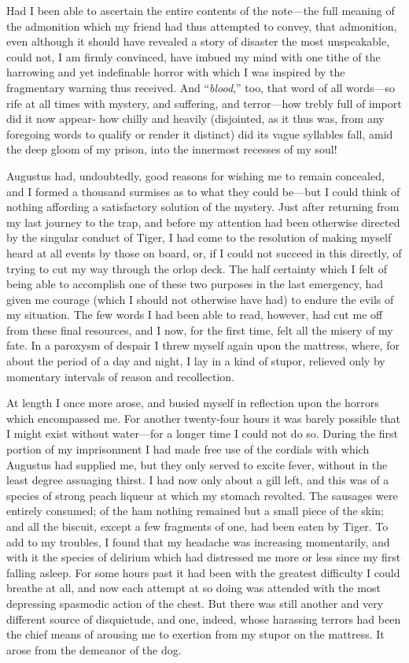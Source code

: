Had I been able to ascertain the entire contents of the note---the full
meaning of the admonition which my friend had thus attempted to convey, that
admonition, even although it should have revealed a story of disaster the most
unspeakable, could not, I am firmly convinced, have imbued my mind with one
tithe of the harrowing and yet indefinable horror with which I was inspired by
the fragmentary warning thus received. And ``\emph{blood},'' too, that word of all
words---so rife at all times with mystery, and suffering, and terror---how
trebly full of import did it now appear- how chilly and heavily (disjointed, as
it thus was, from any foregoing words to qualify or render it distinct) did its
vague syllables fall, amid the deep gloom of my prison, into the innermost
recesses of my soul! 

Augustus had, undoubtedly, good reasons for wishing me to remain concealed,
and I formed a thousand surmises as to what they could be---but I could think of
nothing affording a satisfactory solution of the mystery. Just after returning
from my last journey to the trap, and before my attention had been otherwise
directed by the singular conduct of Tiger, I had come to the resolution of
making myself heard at all events by those on board, or, if I could not succeed
in this directly, of trying to cut my way through the orlop deck. The half
certainty which I felt of being able to accomplish one of these two purposes in
the last emergency, had given me courage (which I should not otherwise have had)
to endure the evils of my situation. The few words I had been able to read,
however, had cut me off from these final resources, and I now, for the first
time, felt all the misery of my fate. In a paroxysm of despair I threw myself
again upon the mattress, where, for about the period of a day and night, I lay
in a kind of stupor, relieved only by momentary intervals of reason and
recollection. 

At length I once more arose, and busied myself in reflection upon the horrors
which encompassed me. For another twenty-four hours it was barely possible that
I might exist without water---for a longer time I could not do so. During the
first portion of my imprisonment I had made free use of the cordials with which
Augustus had supplied me, but they only served to excite fever, without in the
least degree assuaging thirst. I had now only about a gill left, and this was of
a species of strong peach liqueur at which my stomach revolted. The sausages
were entirely consumed; of the ham nothing remained but a small piece of the
skin; and all the biscuit, except a few fragments of one, had been eaten by
Tiger. To add to my troubles, I found that my headache was increasing
momentarily, and with it the species of delirium which had distressed me more or
less since my first falling asleep. For some hours past it had been with the
greatest difficulty I could breathe at all, and now each attempt at so doing was
attended with the most depressing spasmodic action of the chest. But there was
still another and very different source of disquietude, and one, indeed, whose
harassing terrors had been the chief means of arousing me to exertion from my
stupor on the mattress. It arose from the demeanor of the dog. 

